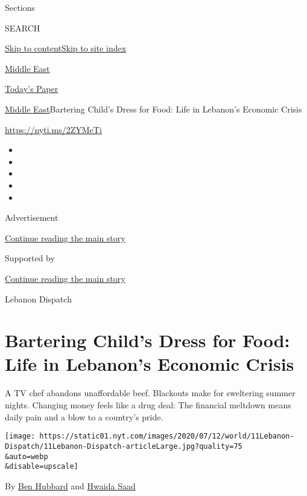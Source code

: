 Sections

SEARCH

\protect\hyperlink{site-content}{Skip to
content}\protect\hyperlink{site-index}{Skip to site index}

\href{https://www.nytimes.com/section/world/middleeast}{Middle East}

\href{https://myaccount.nytimes.com/auth/login?response_type=cookie\&client_id=vi}{}

\href{https://www.nytimes.com/section/todayspaper}{Today's Paper}

\href{/section/world/middleeast}{Middle East}\textbar{}Bartering Child's
Dress for Food: Life in Lebanon's Economic Crisis

\url{https://nyti.ms/2ZYMeTi}

\begin{itemize}
\item
\item
\item
\item
\item
\end{itemize}

Advertisement

\protect\hyperlink{after-top}{Continue reading the main story}

Supported by

\protect\hyperlink{after-sponsor}{Continue reading the main story}

Lebanon Dispatch

\hypertarget{bartering-childs-dress-for-food-life-in-lebanons-economic-crisis}{%
\section{Bartering Child's Dress for Food: Life in Lebanon's Economic
Crisis}\label{bartering-childs-dress-for-food-life-in-lebanons-economic-crisis}}

A TV chef abandons unaffordable beef. Blackouts make for sweltering
summer nights. Changing money feels like a drug deal: The financial
meltdown means daily pain and a blow to a country's pride.

\texttt{[image: https://static01.nyt.com/images/2020/07/12/world/11Lebanon-Dispatch/11Lebanon-Dispatch-articleLarge.jpg?quality=75\\\&auto=webp\\\&disable=upscale]}

By \href{https://www.nytimes.com/by/ben-hubbard}{Ben Hubbard} and
\href{https://www.nytimes.com/by/hwaida-saad}{Hwaida Saad}

